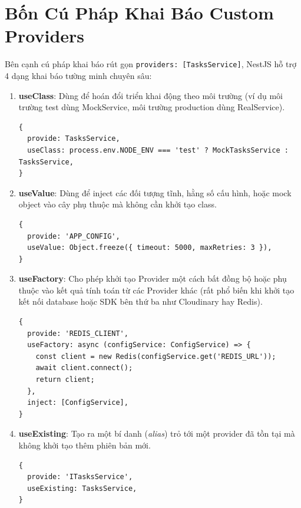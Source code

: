 \documentclass[12pt,a4paper,oneside]{book}
\begin{document}
\section{Bốn Cú Pháp Khai Báo Custom Providers}
Bên cạnh cú pháp khai báo rút gọn \texttt{providers: [TasksService]}, NestJS hỗ trợ 4 dạng khai báo tường minh chuyên sâu:
\begin{enumerate}
  \item \textbf{useClass}: Dùng để hoán đổi triển khai động theo môi trường (ví dụ môi trường test dùng MockService, môi trường production dùng RealService).
\begin{codebox}
\begin{Verbatim}[fontsize=\small]
{
  provide: TasksService,
  useClass: process.env.NODE_ENV === 'test' ? MockTasksService : TasksService,
}
\end{Verbatim}
\end{codebox}
  \item \textbf{useValue}: Dùng để inject các đối tượng tĩnh, hằng số cấu hình, hoặc mock object vào cây phụ thuộc mà không cần khởi tạo class.
\begin{codebox}
\begin{Verbatim}[fontsize=\small]
{
  provide: 'APP_CONFIG',
  useValue: Object.freeze({ timeout: 5000, maxRetries: 3 }),
}
\end{Verbatim}
\end{codebox}
  \item \textbf{useFactory}: Cho phép khởi tạo Provider một cách bất đồng bộ hoặc phụ thuộc vào kết quả tính toán từ các Provider khác (rất phổ biến khi khởi tạo kết nối database hoặc SDK bên thứ ba như Cloudinary hay Redis).
\begin{codebox}
\begin{Verbatim}[fontsize=\small]
{
  provide: 'REDIS_CLIENT',
  useFactory: async (configService: ConfigService) => {
    const client = new Redis(configService.get('REDIS_URL'));
    await client.connect();
    return client;
  },
  inject: [ConfigService],
}
\end{Verbatim}
\end{codebox}
  \item \textbf{useExisting}: Tạo ra một bí danh (\textit{alias}) trỏ tới một provider đã tồn tại mà không khởi tạo thêm phiên bản mới.
\begin{codebox}
\begin{Verbatim}[fontsize=\small]
{
  provide: 'ITasksService',
  useExisting: TasksService,
}
\end{Verbatim}
\end{codebox}
\end{enumerate}
\end{document}

